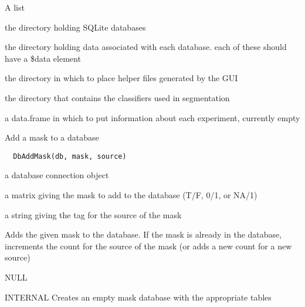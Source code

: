 \documentclass[a4paper]{book}
\begin{document}
%
\begin{Value}
A list \begin{ldescription}
\item[\code{db.directory}] the directory holding SQLite
databases\item[\code{data.directory}] the directory holding
data associated with each database.  each of these should
have a \bsl{}\$data element\item[\code{helper.directory}] the
directory in which to place helper files generated by the
GUI\item[\code{classifier.direcoty}] the directory that
contains the classifiers used in segmentation
\item[\code{expdf}] a data.frame in which to put information
about each experiment, currently empty
\end{ldescription}
\end{Value}
%
\begin{Description}\relax
Add a mask to a database
\end{Description}
%
\begin{Usage}
\begin{verbatim}
  DbAddMask(db, mask, source)
\end{verbatim}
\end{Usage}
%
\begin{Arguments}
\begin{ldescription}
\item[\code{db}] a database connection object

\item[\code{mask}] a matrix giving the mask to add to the
database (T/F, 0/1, or NA/1)

\item[\code{source}] a string giving the tag for the source of
the mask
\end{ldescription}
\end{Arguments}
%
\begin{Details}\relax
Adds the given mask to the database.  If the mask is
already in the database, increments the count for the
source of the mask (or adds a new count for a new source)
\end{Details}
%
\begin{Value}
NULL
\end{Value}
%
\begin{Description}\relax
INTERNAL Creates an empty mask database with the
appropriate tables
\end{Description}
\end{document}
